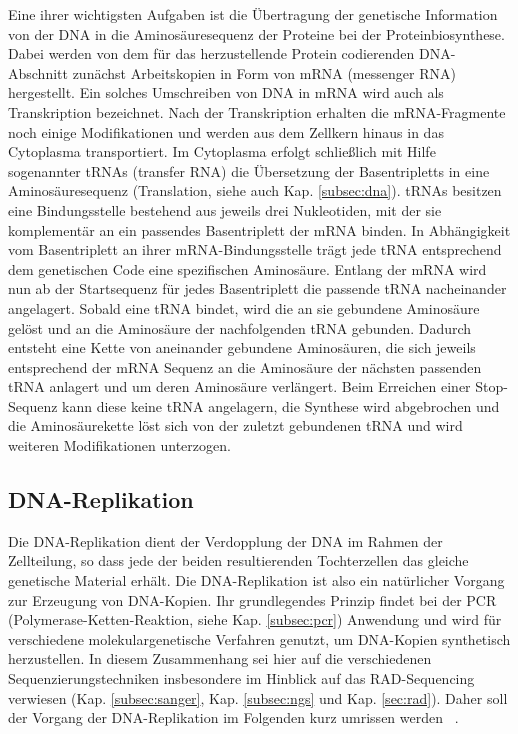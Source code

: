 Eine ihrer wichtigsten Aufgaben ist die Übertragung der genetische Information von der DNA in die Aminosäuresequenz der Proteine bei der Proteinbiosynthese. Dabei werden von dem für das herzustellende Protein codierenden DNA-Abschnitt zunächst Arbeitskopien in Form von mRNA (messenger RNA) hergestellt. Ein solches Umschreiben von DNA in mRNA wird auch als Transkription bezeichnet. Nach der Transkription erhalten die mRNA-Fragmente noch einige Modifikationen und werden aus dem Zellkern hinaus in das Cytoplasma transportiert. Im Cytoplasma erfolgt schließlich mit Hilfe sogenannter tRNAs (transfer RNA) die Übersetzung der Basentripletts in eine Aminosäuresequenz (Translation, siehe auch Kap. \ref{subsec:dna}). tRNAs besitzen eine Bindungsstelle bestehend aus jeweils drei Nukleotiden, mit der sie komplementär an ein passendes Basentriplett der mRNA binden. In Abhängigkeit vom Basentriplett an ihrer mRNA-Bindungsstelle trägt jede tRNA entsprechend dem genetischen Code eine spezifischen Aminosäure. Entlang der mRNA wird nun ab der Startsequenz für jedes Basentriplett die passende tRNA nacheinander angelagert. Sobald eine tRNA bindet, wird die an sie gebundene Aminosäure gelöst und an die Aminosäure der nachfolgenden tRNA gebunden. Dadurch entsteht eine Kette von aneinander gebundene Aminosäuren, die sich jeweils entsprechend der mRNA Sequenz an die Aminosäure der nächsten passenden tRNA anlagert und um deren Aminosäure verlängert. Beim Erreichen einer Stop-Sequenz kann diese keine tRNA angelagern, die Synthese wird abgebrochen und die Aminosäurekette löst sich von der zuletzt gebundenen tRNA und wird weiteren Modifikationen unterzogen. \\

\subsection{DNA-Replikation} \label{subsec:replication}

Die DNA-Replikation dient der Verdopplung der DNA im Rahmen der Zellteilung, so dass jede der beiden resultierenden Tochterzellen das gleiche genetische Material erhält. Die DNA-Replikation ist also ein natürlicher Vorgang zur Erzeugung von DNA-Kopien. Ihr grundlegendes Prinzip findet bei der PCR (Polymerase-Ketten-Reaktion, siehe Kap. \ref{subsec:pcr}) Anwendung und wird für verschiedene molekulargenetische Verfahren genutzt, um DNA-Kopien synthetisch herzustellen. In diesem Zusammenhang sei hier auf die verschiedenen Sequenzierungstechniken insbesondere im Hinblick auf das RAD-Sequencing verwiesen (Kap. \ref{subsec:sanger}, Kap. \ref{subsec:ngs} und Kap. \ref{sec:rad}). Daher soll der Vorgang der DNA-Replikation im Folgenden kurz umrissen werden ~\cite{odonell_2013, chargin_2010, prioleau_2016}. \\

